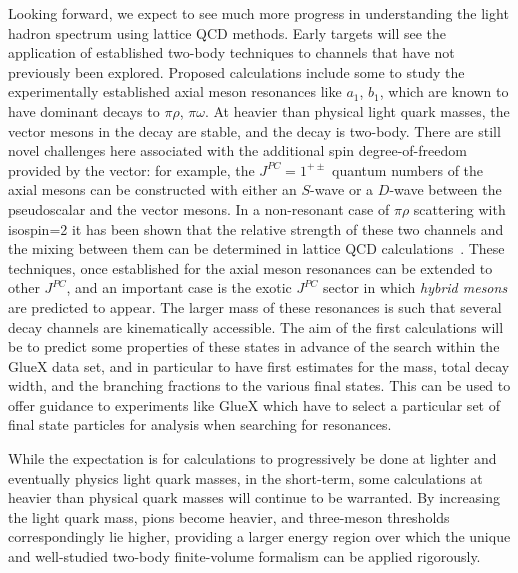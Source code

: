 

Looking forward, we expect to see much more progress in understanding the light hadron spectrum using lattice QCD methods. Early targets will see the application of established two-body techniques to channels that have not previously been explored. Proposed calculations include some to study the experimentally established axial meson resonances like $a_1$, $b_1$, which are known to have dominant decays to $\pi \rho$, $\pi \omega$. At heavier than physical light quark masses, the vector mesons in the decay are stable, and the decay is two-body. There are still novel challenges here associated with the additional spin degree-of-freedom provided by the vector: for example, the $J^{PC}=1^{+\pm}$ quantum numbers of the axial mesons can be constructed with either an $S$-wave or a $D$-wave between the pseudoscalar and the vector mesons. In a non-resonant case of $\pi \rho$ scattering with isospin=2 it has been shown that the relative strength of these two channels and the mixing between them can be determined in lattice QCD calculations~\cite{Woss:2018irj}. These techniques, once established for the axial meson resonances can be extended to other $J^{PC}$, and an important case is the exotic $J^{PC}$ sector in which \emph{hybrid mesons} are predicted to appear. The larger mass of these resonances is such that several decay channels are kinematically accessible. The aim of the first calculations will be to predict some properties of these states in advance of the search within the GlueX data set, and in particular to have first estimates for the mass, total decay width, and the branching fractions to the various final states. This can be used to offer guidance to experiments like GlueX which have to select a particular set of final state particles for analysis when searching for resonances.

While the expectation is for calculations to progressively be done at lighter and eventually physics light quark masses, in the short-term, some calculations at heavier than physical quark masses will continue to be warranted. By increasing the light quark mass, pions become heavier, and three-meson thresholds correspondingly lie higher, providing a larger energy region over which the unique and well-studied two-body finite-volume formalism can be applied rigorously. 

